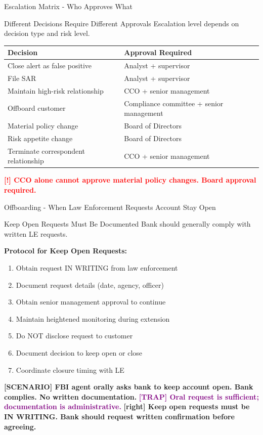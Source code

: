 \documentclass[11pt,a4paper]{beamer}
\newcommand{\redflag}[1]{\textcolor{red}{\textbf{[!] #1}}}
\newcommand{\trap}[1]{\textcolor{purple}{\textbf{[TRAP] #1}}}
\newcommand{\correct}[1]{\textcolor{green!50!black}{\textbf{[right] #1}}}
\newcommand{\scenario}[1]{\textcolor{blue!70!black}{\textbf{[SCENARIO] #1}}}
\begin{document}

\begin{frame}{Escalation Matrix - Who Approves What}
\begin{block}{Different Decisions Require Different Approvals}
Escalation level depends on decision type and risk level.
\end{block}
\begin{tabular}{p{}|p{}}
\hline
\rowcolor{lightgray}
\textbf{Decision} & \textbf{Approval Required} \\
\hline
Close alert as false positive & Analyst + supervisor \\
File SAR & Analyst + supervisor \\
Maintain high-risk relationship & CCO + senior management \\
Offboard customer & Compliance committee + senior management \\
Material policy change & Board of Directors \\
Risk appetite change & Board of Directors \\
Terminate correspondent relationship & CCO + senior management \\
\hline
\end{tabular}
\redflag{CCO alone cannot approve material policy changes. Board approval required.}
\end{frame}

\begin{frame}{Offboarding - When Law Enforcement Requests Account Stay Open}
\begin{block}{Keep Open Requests Must Be Documented}
Bank should generally comply with written LE requests.
\end{block}
\textbf{Protocol for Keep Open Requests:}
\begin{enumerate}
\item Obtain request IN WRITING from law enforcement
\item Document request details (date, agency, officer)
\item Obtain senior management approval to continue
\item Maintain heightened monitoring during extension
\item Do NOT disclose request to customer
\item Document decision to keep open or close
\item Coordinate closure timing with LE
\end{enumerate}
\scenario{FBI agent orally asks bank to keep account open. Bank complies. No written documentation.}
\trap{Oral request is sufficient; documentation is administrative.}
\correct{Keep open requests must be IN WRITING. Bank should request written confirmation before agreeing.}
\end{frame}
\end{document}
